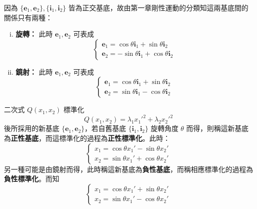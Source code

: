 因為 $\{\mathbf{e}_1, \mathbf{e}_2\}, \{\mathbf{i}_1, \mathbf{i}_2\}$ 皆為正交基底，故由第一章剛性運動的分類知這兩基底間的關係只有兩種：
\begin{enumerate}[(i)]
  \item \textbf{旋轉：} 此時 $\mathbf{e}_1, \mathbf{e}_2$ 可表成
  \begin{equation}
  \begin{cases}
  \mathbf{e}_1 = \cos\theta \mathbf{i}_1 + \sin\theta \mathbf{i}_2 \\
  \mathbf{e}_2 = -\sin\theta \mathbf{i}_1 + \cos\theta \mathbf{i}_2
  \end{cases}
  \label{eq:b4-ch4-rot-basis}
  \end{equation}
  \item \textbf{鏡射：} 此時 $\mathbf{e}_1, \mathbf{e}_2$ 可表成
  \begin{equation}
  \begin{cases}
  \mathbf{e}_1 = \cos\theta \mathbf{i}_1 + \sin\theta \mathbf{i}_2 \\
  \mathbf{e}_2 = \sin\theta \mathbf{i}_1 - \cos\theta \mathbf{i}_2
  \end{cases}
  \label{eq:b4-ch4-refl-basis}
  \end{equation}
\end{enumerate}

\begin{definition}
二次式 $Q(x_1, x_2)$ 標準化
\[
Q(x_1, x_2) = \lambda_1 {x_1'}^2 + \lambda_2 {x_2'}^2
\]
後所採用的新基底 $\{\mathbf{e}_1, \mathbf{e}_2\}$，若自舊基底 $\{\mathbf{i}_1, \mathbf{i}_2\}$ 旋轉角度 $\theta$ 而得，則稱這新基底為\textbf{正性基底}，而這標準化的過程為\textbf{正性標準化}。此時：
\begin{equation}
\begin{cases}
x_1 = \cos\theta x_1' - \sin\theta x_2' \\
x_2 = \sin\theta x_1' + \cos\theta x_2'
\end{cases}
\label{eq:b4-ch4-pos-standard-coord}
\end{equation}
另一種可能是由鏡射而得，此時稱這新基底為\textbf{負性基底}，而稱相應標準化的過程為\textbf{負性標準化}。而知
\begin{equation}
\begin{cases}
x_1 = \cos\theta x_1' + \sin\theta x_2' \\
x_2 = \sin\theta x_1' - \cos\theta x_2'
\end{cases}
\label{eq:b4-ch4-neg-standard-coord}
\end{equation}
\end{definition}

